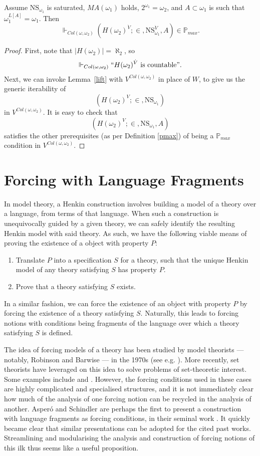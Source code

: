 \documentclass[12pt]{article}
\numberwithin{equation}{section}
\begin{document}
\begin{lem}\label{ho2}
Assume $\mathrm{NS}_{\omega_1}$ is saturated, $MA(\omega_1)$ holds, $2^{\omega_1} = \omega_2$, and $A \subset \omega_1$ is such that $\omega_1^{L[A]} = \omega_1$. Then $$\Vdash_{Col(\omega, \omega_2)} (H(\omega_2)^{\dot{V}}; \in, \mathrm{NS}_{\omega_1}^{\dot{V}}, A) \in \mathbb{P}_{max}.$$
\end{lem}
\begin{proof}
First, note that $|H(\omega_2)| = \aleph_2$, so $$\Vdash_{Col(\omega, \omega_2)} ``H(\omega_2)^{\dot{V}} \text{ is countable}".$$ Next, we can invoke Lemma~\ref{lift} with $V^{Col(\omega, \omega_2)}$ in place of $W$, to give us the generic iterability of $$(H(\omega_2)^{V}; \in, \mathrm{NS}_{\omega_1})$$ in $V^{Col(\omega, \omega_2)}$. It is easy to check that $$(H(\omega_2)^{V}; \in, \mathrm{NS}_{\omega_1}, A)$$ satisfies the other prerequisites (as per Definition \ref{pmax}) of being a $\mathbb{P}_{max}$ condition in $V^{Col(\omega, \omega_2)}$. 
\end{proof}

\section{Forcing with Language Fragments}\label{setupsec}

In model theory, a Henkin construction involves building a model of a theory over a language, from terms of that language. When such a construction is unequivocally guided by a given theory, we can safely identify the resulting Henkin model with said theory. As such, we have the following viable means of proving the existence of a object with property $P$: 
\begin{enumerate}
    \item Translate $P$ into a specification $S$ for a theory, such that the unique Henkin model of any theory satisfying $S$ has property $P$.
    \item Prove that a theory satisfying $S$ exists.
\end{enumerate}
In a similar fashion, we can force the existence of an object with property $P$ by forcing the existence of a theory satisfying $S$. Naturally, this leads to forcing notions with conditions being fragments of the language over which a theory satisfying $S$ is defined.

The idea of forcing models of a theory has been studied by model theorists --- notably, Robinson and Barwise --- in the 1970s (see e.g. \cite{keisler}). More recently, set theorists have leveraged on this idea to solve problems of set-theoretic interest. Some examples include \cite{doebler} and \cite{lforcing}. However, the forcing conditions used in these cases are highly complicated and specialised structures, and it is not immediately clear how much of the analysis of one forcing notion can be recycled in the analysis of another. Asper\'{o} and Schindler are perhaps the first to present a construction with language fragments as forcing conditions, in their seminal work \cite{schindler}. It quickly became clear that similar presentations can be adopted for the cited past works. Streamlining and modularising the analysis and construction of forcing notions of this ilk thus seems like a useful proposition.
\end{document}
